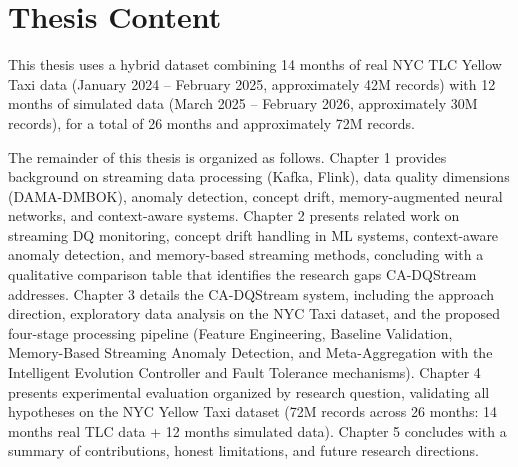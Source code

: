 \section{Thesis Content}
This thesis uses a hybrid dataset combining 14 months of real NYC TLC Yellow Taxi data (January 2024 -- February 2025, approximately 42M records) with 12 months of simulated data (March 2025 -- February 2026, approximately 30M records), for a total of 26 months and approximately 72M records.

The remainder of this thesis is organized as follows. Chapter 1 provides background on streaming data processing (Kafka, Flink), data quality dimensions (DAMA-DMBOK), anomaly detection, concept drift, memory-augmented neural networks, and context-aware systems. Chapter 2 presents related work on streaming DQ monitoring, concept drift handling in ML systems, context-aware anomaly detection, and memory-based streaming methods, concluding with a qualitative comparison table that identifies the research gaps CA-DQStream addresses. Chapter 3 details the CA-DQStream system, including the approach direction, exploratory data analysis on the NYC Taxi dataset, and the proposed four-stage processing pipeline (Feature Engineering, Baseline Validation, Memory-Based Streaming Anomaly Detection, and Meta-Aggregation with the Intelligent Evolution Controller and Fault Tolerance mechanisms). Chapter 4 presents experimental evaluation organized by research question, validating all hypotheses on the NYC Yellow Taxi dataset (72M records across 26 months: 14 months real TLC data + 12 months simulated data). Chapter 5 concludes with a summary of contributions, honest limitations, and future research directions.
